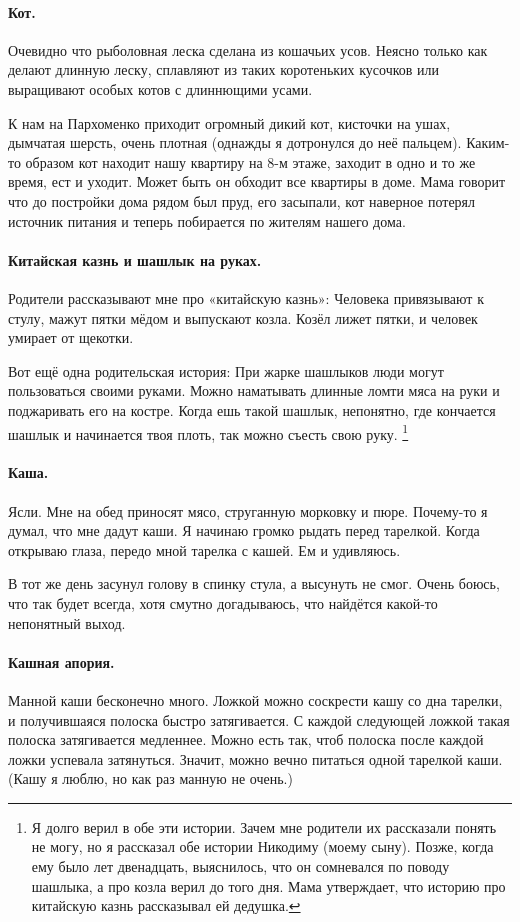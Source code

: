 \documentclass{book}
\begin{document}
\paragraph{Кот.}
Очевидно что рыболовная леска сделана из кошачьих усов.
Неясно только как делают длинную леску,  сплавляют из таких коротеньких кусочков 
или выращивают особых котов с длиннющими усами.

К нам на Пархоменко приходит огромный дикий кот, 
кисточки на ушах, дымчатая  шерсть,
очень плотная
(однажды я дотронулся до неё пальцем).
Каким-то образом кот находит нашу квартиру на 8-м этаже, заходит в одно и то же время, ест и уходит.
Может быть он обходит все квартиры в доме.
Мама говорит что до постройки дома рядом был пруд, его засыпали,
кот наверное потерял источник питания и теперь побирается по жителям нашего дома.

\paragraph{Китайская казнь и шашлык на руках.}
Родители рассказывают мне про «китайскую казнь»: 
Человека привязывают к стулу, мажут пятки мёдом и выпускают козла.
Козёл лижет пятки, и человек умирает от щекотки.

Вот ещё одна родительская история:
При жарке шашлыков люди могут пользоваться своими руками.
Можно наматывать длинные ломти мяса на руки и поджаривать его на костре.
Когда ешь такой шашлык, непонятно, где кончается шашлык и начинается твоя плоть,
так можно съесть свою руку.%
\footnote{Я долго верил в  обе эти истории.
Зачем мне родители их рассказали понять не могу, 
но я рассказал обе истории Никодиму (моему сыну).
Позже, когда ему было лет двенадцать,
выяснилось, что он сомневался по поводу шашлыка, а про козла верил до того дня.
Мама утверждает, что историю про китайскую казнь рассказывал ей дедушка.}

\paragraph{Каша.}
Ясли.
Мне на обед приносят мясо, струганную морковку и пюре.
Почему-то я думал, что мне дадут каши.
Я начинаю громко рыдать перед тарелкой. 
Когда открываю глаза, передо мной тарелка с кашей.
Ем и удивляюсь.

В тот же день засунул голову в спинку стула, а высунуть не смог.
Очень боюсь, что так будет всегда, хотя смутно догадываюсь, что найдётся какой-то непонятный выход.

\paragraph{Кашная апория.}
Манной каши бесконечно много.
Ложкой можно соскрести кашу со дна тарелки,
и получившаяся полоска быстро затягивается.
С каждой следующей ложкой такая полоска затягивается медленнее.
Можно есть так, чтоб полоска после каждой ложки успевала затянуться.
Значит, можно вечно питаться одной тарелкой каши.
(Кашу я люблю, но как раз манную не очень.)
\end{document}
